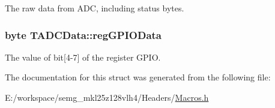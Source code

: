 The raw data from A\-D\-C, including status bytes. \hypertarget{struct_t_a_d_c_data_a5c28a29a781e6c6cf83bed5d0c1b4669}{
\subsubsection[{reg\-G\-P\-I\-O\-Data}]{\setlength{\rightskip}{0pt plus 5cm}byte T\-A\-D\-C\-Data\-::reg\-G\-P\-I\-O\-Data}}\label{struct_t_a_d_c_data_a5c28a29a781e6c6cf83bed5d0c1b4669}
The value of bit\mbox{[}4-\/7\mbox{]} of the register G\-P\-I\-O. 

The documentation for this struct was generated from the following file\-:\begin{DoxyCompactItemize}
\item 
E\-:/workspace/semg\-\_\-mkl25z128vlh4/\-Headers/\hyperlink{_macros_8h}{Macros.\-h}\end{DoxyCompactItemize}
